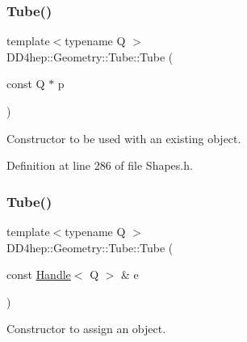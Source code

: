 \hypertarget{class_d_d4hep_1_1_geometry_1_1_tube_afb6ca694ec53edb539b34b90d78c750f}{}\label{class_d_d4hep_1_1_geometry_1_1_tube_afb6ca694ec53edb539b34b90d78c750f} 
\subsubsection{\texorpdfstring{Tube()}{Tube()}\hspace{0.1cm}{\footnotesize\ttfamily [3/10]}}
{\footnotesize\ttfamily template$<$typename Q $>$ \\
D\+D4hep\+::\+Geometry\+::\+Tube\+::\+Tube (\begin{DoxyParamCaption}\item[{const Q $\ast$}]{p }\end{DoxyParamCaption})\hspace{0.3cm}{\ttfamily [inline]}}



Constructor to be used with an existing object. 



Definition at line 286 of file Shapes.\+h.

\hypertarget{class_d_d4hep_1_1_geometry_1_1_tube_ab21bc287433e3e7e284dcf6d10dccfd6}{}\label{class_d_d4hep_1_1_geometry_1_1_tube_ab21bc287433e3e7e284dcf6d10dccfd6} 
\subsubsection{\texorpdfstring{Tube()}{Tube()}\hspace{0.1cm}{\footnotesize\ttfamily [4/10]}}
{\footnotesize\ttfamily template$<$typename Q $>$ \\
D\+D4hep\+::\+Geometry\+::\+Tube\+::\+Tube (\begin{DoxyParamCaption}\item[{const \hyperlink{class_d_d4hep_1_1_handle}{Handle}$<$ Q $>$ \&}]{e }\end{DoxyParamCaption})\hspace{0.3cm}{\ttfamily [inline]}}



Constructor to assign an object. 



